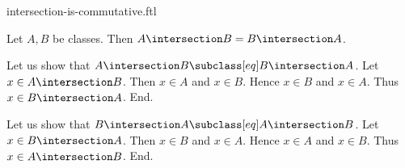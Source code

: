 \documentclass{article}
\begin{document}
\begin{smodule}[creators={Marcel Schütz}]{intersection-is-commutative.ftl}

  \begin{fproposition*}[label=8211920689561600]
    Let $A, B$ be classes.
    Then $A \intersection B = B \intersection A$.
  \end{fproposition*}
  \begin{fproof}
    Let us show that $A \intersection B \subclass[eq] B \intersection A$.
      Let $x \in A \intersection B$.
      Then $x \in A$ and $x \in B$.
      Hence $x \in B$ and $x \in A$.
      Thus $x \in B \intersection A$.
    End.

    Let us show that $B \intersection A \subclass[eq] A \intersection B$.
      Let $x \in B \intersection A$.
      Then $x \in B$ and $x \in A$.
      Hence $x \in A$ and $x \in B$.
      Thus $x \in A \intersection B$.
    End.
  \end{fproof}
\end{smodule}
\end{document}
